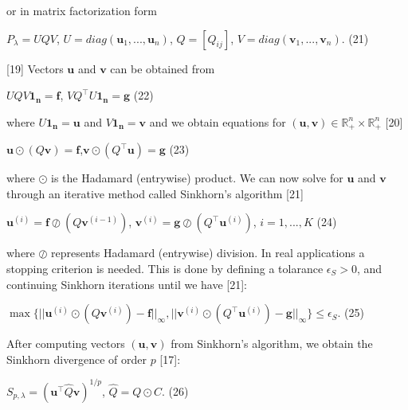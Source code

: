 \documentclass[botnum, fleqn]{unmeethesis}
\begin{document}
or in matrix factorization form

\hspace{\fill}$P_\lambda=UQV$, \hspace{0.2cm}$U=diag(\bm{u}_1,...,\bm{u}_n)$, \hspace{0.2cm}$Q=[Q_{ij}]$,\hspace{0.2cm} $V=diag(\bm{v}_1,...,\bm{v}_n)$.\hspace{\fill} \normalsize (21)

[19] Vectors $\bm{u}$ and $\bm{v}$ can be obtained from 

\hspace{\fill}$UQV\bm{1_n}=\bm{f}$, \hspace{1cm} $VQ^\top U\bm{1_n}=\bm{g}$\hspace{\fill} \normalsize (22)

\noindent where $U\bm{1_n}=\bm{u}$ and $V\bm{1_n}=\bm{v}$ and we obtain equations for $(\bm{u},\bm{v})\in\mathbb{R}^{n}_+\times \mathbb{R}^{n}_+$ [20]

\hspace{\fill}$\bm{u}\odot (Q\bm{v})=\bm{f}$,\hspace{1cm}$\bm{v}\odot (Q^\top\bm{u})=\bm{g}$\hspace{\fill} \normalsize (23)

where $\odot$ is the Hadamard (entrywise) product. We can now solve for $\bm{u}$ and $\bm{v}$ through an iterative method called Sinkhorn's algorithm [21]

\hspace{\fill}$\bm{u}^{(i)}=\bm{f}\oslash (Q\bm{v}^{(i-1)})$, $\bm{v}^{(i)}=\bm{g}\oslash (Q^\top\bm{u}^{(i)})$, $i=1,...,K$\hspace{\fill} \normalsize (24)
 
where $\oslash$ represents Hadamard (entrywise) division. In real applications a stopping criterion is needed. This is done by defining a tolarance $\epsilon_S>0$, and continuing Sinkhorn iterations until we have [21]:

\hspace{\fill}$\max\{||\bm{u}^{(i)}\odot (Q\bm{v}^{(i)})-\bm{f}||_\infty, ||\bm{v}^{(i)}\odot (Q^\top\bm{u}^{(i)})-\bm{g}||_\infty    \}\leq \epsilon_S$.\hspace{\fill} \normalsize (25) 

\overfullrule=0pt After computing vectors $(\bm{u},\bm{v})$ from Sinkhorn's algorithm, we obtain the Sinkhorn divergence of order $p$ [17]: 

\hspace{\fill}$S_{p,\lambda}=(\bm{u}^\top\widehat{Q}\bm{v})^{1/p}$,\hspace{1cm} $\widehat{Q}=Q\odot C$.\hspace{\fill} \normalsize (26)
\end{document}
